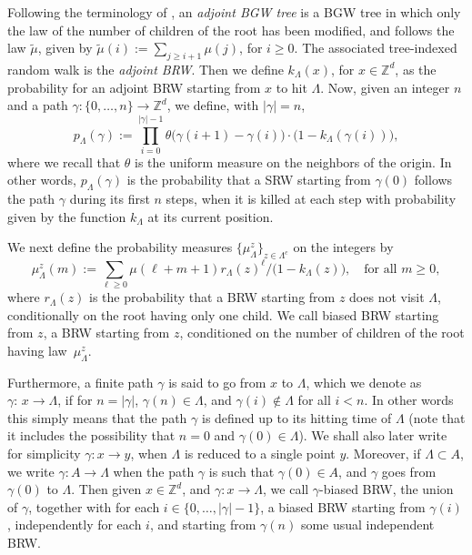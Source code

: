 \documentclass[JEP,XML,SOM,Unicode,NoFloatCountersInSection,published]{cedram}
\theoremstyle{plain}
\theoremstyle{definition}
\newcommand{\1}{{\text{\Large $\mathfrak 1$}}}
\begin{document}
Following the terminology of \cite{Zhu1,Zhu3}, an
{\it adjoint BGW tree} is a BGW tree in which only the law
of the number of children of
the root has been modified, and follows the law $\tilde \mu$, given by $\tilde \mu(i) := \sum_{j\ge i+1} \mu(j)$, for $i\ge 0$. The associated
tree-indexed random walk is the {\it adjoint BRW}.
Then we define $k_\Lambda(x)$, for $x\in \mathbb Z^d$, as the probability for an adjoint BRW starting from $x$ to hit $\Lambda$.
Now, given an integer $n$ and
a path $\gamma:\{0,\dots,n\} \to \mathbb Z^d$,
we define, with $|\gamma|= n$,
\begin{equation}\label{def.pLambda}
p_\Lambda(\gamma):= \prod_{i=0}^{|\gamma|-1}\theta\big(\gamma(i+1)-\gamma(i)\big) \cdot \big(1- k_\Lambda(\gamma(i))\big),
\end{equation}
where we recall that $\theta$ is the uniform measure on the neighbors of the origin.
In other words, $p_\Lambda(\gamma)$ is the probability that a SRW starting from $\gamma(0)$ follows the path $\gamma$ during its first $n$ steps,
when it is killed at each step with probability given by the function $k_\Lambda$ at its current position.

We next define the probability measures $\{\mu_\Lambda^z\}_{z\in \Lambda^c}$ on the integers by
\begin{equation*}
\mu_\Lambda^z(m) :=
\sum_{\ell \ge 0} \mu(\ell + m +1) r_\Lambda(z)^\ell / \big(1-k_\Lambda(z)\big), \quad \text{for all }m\ge 0,
\end{equation*}
where $r_\Lambda(z)$ is the probability that a BRW starting from $z$ does not visit $\Lambda$, conditionally on the root having only one child.
We call biased BRW starting from $z$, a BRW starting from $z$, conditioned on the number of children of the root having law~$\mu_\Lambda^z$.

Furthermore, a finite path $\gamma$
is said to go from $x$ to $\Lambda$,
which we denote as \hbox{$\gamma{:}\,x\!\to\! \Lambda$},
if for $n=|\gamma|$, $\gamma(n)\in \Lambda$,
and $\gamma(i)\notin \Lambda$ for all $i<n$.
In other words this simply means that the path $\gamma$ is defined up
to its hitting time of $\Lambda$
(note that it includes the possibility that $n=0$ and $\gamma(0) \in \Lambda$). We shall also later
write for simplicity $\gamma:x\to y$, when $\Lambda$ is reduced to a single point $y$. Moreover, if $\Lambda\subset A$, we write $\gamma:A\to \Lambda$ when the path $\gamma$ is such that $\gamma(0)\in A$, and $\gamma$ goes from $\gamma(0)$ to $\Lambda$.
Then given $x\in \mathbb Z^d$, and $\gamma:x\to \Lambda$,
we call $\gamma$-biased BRW, the union of $\gamma$, together with for each $i\in \{0,\dots,|\gamma|-1\}$,
a biased BRW starting from $\gamma(i)$, independently for each $i$, and starting from $\gamma(n)$ some usual independent BRW.
\end{document}
